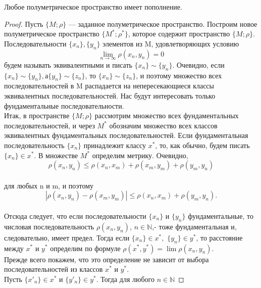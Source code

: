 \begin{theorem} Любое полуметрическое пространство имеет пополнение. \\
	\end{theorem}
\begin{proof} Пусть $\{M ; \rho\}$ — заданное полуметрическое пространство. Построим новое полуметрическое пространство $\{M^*;\rho^* \}$, которое содержит пространство $\{M;\rho \}$.
Последовательности $\{x_n\}, \{y_n\}$ элементов из M, удовлетворяющих условию
$$\lim\limits_{n\to \infty} \rho(x_n,y_n) = 0$$
будем называть эквивалентными и писать $\{x_n\} \sim \{y_n\}$. Очевидно, если $\{x_n\} \sim \{y_n\}, а \{y_n\} \sim \{z_n\}$, то $\{x_n\} \sim \{z_n\}$, и поэтому множество всех последовательностей в M распадается на непересекающиеся классы эквивалентных последовательностей. Нас будут интересовать только фундаментальные последовательности.\\
Итак, в пространстве $\{M ; \rho\}$ рассмотрим множество всех фундаментальных последовательностей, и через $M^*$ обозначим множество всех классов эквивалентных фундаментальных последовательностей. Если фундаментальная последовательность $\{x_n\}$ принадлежит классу $x^*$, то, как обычно, будем писать $\{x_n\} \in x^*$. В множестве $M^*$ определим метрику. Очевидно,
$$\rho(x_n,y_n) \leq \rho(x_n,x_m) + \rho(x_m,y_m) + \rho(y_m,y_n)$$ \\
для любых n и m, и поэтому
$$|\rho(x_n,y_n) - \rho(x_m,y_m)| \leq \rho(x_n,x_m) + \rho(y_m,y_n).$$\\
Отсюда следует, что если последовательности $\{x_n\}$ и $\{y_n\}$ фундаментальные, то числовая последовательность $\rho(x_n,y_n)$, $n \in \mathds{N}$,- тоже фундаментальная и, следовательно, имеет предел. Тогда если $\{x_n\} \in x^*,$ $\{y_n\} \in y^*$, то расстояние между $x^* $ и $ y^*$ определим по формуле
$\rho(x^*,y^*) = \lim \rho(x_n,y_n).$\\
Прежде всего покажем, что это определение не зависит от выбора последовательностей из классов $x^*$ и $y^*.$\\
Пусть $\{x'_n\} \in x^* $ и $ \{y'_n\} \in y^*$. Тогда для любого $ n \in \mathds{N}$


\end{proof}
